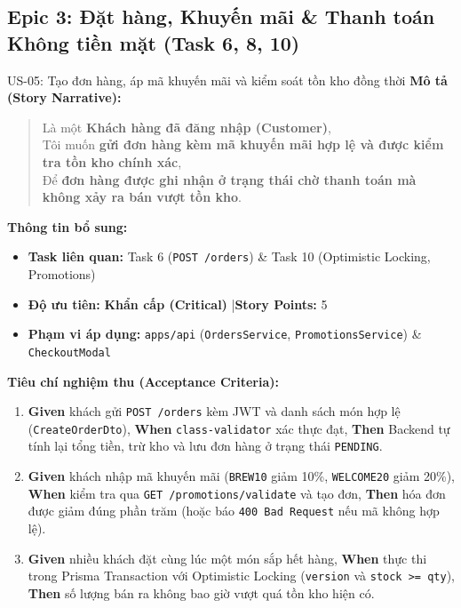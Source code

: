 \documentclass[12pt,a4paper]{article}
\begin{document}
\subsection{Epic 3: Đặt hàng, Khuyến mãi \& Thanh toán Không tiền mặt (Task 6, 8, 10)}

\begin{userstorybox}{US-05: Tạo đơn hàng, áp mã khuyến mãi và kiểm soát tồn kho đồng thời}
    \textbf{Mô tả (Story Narrative):}
    \begin{quote}
        Là một \textbf{Khách hàng đã đăng nhập (Customer)},\\
        Tôi muốn \textbf{gửi đơn hàng kèm mã khuyến mãi hợp lệ và được kiểm tra tồn kho chính xác},\\
        Để \textbf{đơn hàng được ghi nhận ở trạng thái chờ thanh toán mà không xảy ra bán vượt tồn kho}.
    \end{quote}

    \textbf{Thông tin bổ sung:}
    \begin{itemize}[noitemsep]
        \item \textbf{Task liên quan:} Task 6 (\texttt{POST /orders}) \& Task 10 (Optimistic Locking, Promotions)
        \item \textbf{Độ ưu tiên:} \textcolor{taghigh}{\textbf{Khẩn cấp (Critical)}} \quad|\quad \textbf{Story Points:} 5
        \item \textbf{Phạm vi áp dụng:} \texttt{apps/api} (\texttt{OrdersService}, \texttt{PromotionsService}) \& \texttt{CheckoutModal}
    \end{itemize}

    \textbf{Tiêu chí nghiệm thu (Acceptance Criteria):}
    \begin{enumerate}[noitemsep]
        \item \textbf{Given} khách gửi \texttt{POST /orders} kèm JWT và danh sách món hợp lệ (\texttt{CreateOrderDto}), \textbf{When} \texttt{class-validator} xác thực đạt, \textbf{Then} Backend tự tính lại tổng tiền, trừ kho và lưu đơn hàng ở trạng thái \texttt{PENDING}.
        \item \textbf{Given} khách nhập mã khuyến mãi (\texttt{BREW10} giảm 10\%, \texttt{WELCOME20} giảm 20\%), \textbf{When} kiểm tra qua \texttt{GET /promotions/validate} và tạo đơn, \textbf{Then} hóa đơn được giảm đúng phần trăm (hoặc báo \texttt{400 Bad Request} nếu mã không hợp lệ).
        \item \textbf{Given} nhiều khách đặt cùng lúc một món sắp hết hàng, \textbf{When} thực thi trong Prisma Transaction với Optimistic Locking (\texttt{version} và \texttt{stock >= qty}), \textbf{Then} số lượng bán ra không bao giờ vượt quá tồn kho hiện có.
    \end{enumerate}
\end{userstorybox}
\end{document}
